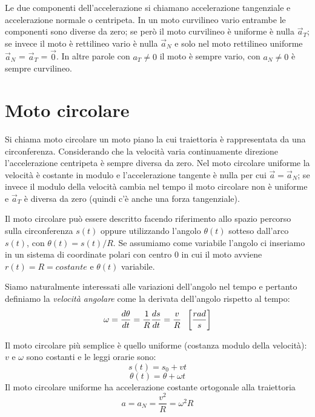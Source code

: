 \documentclass[class=book, crop=false, oneside, 12pt]{standalone}
\begin{document}
Le due componenti dell'accelerazione si chiamano accelerazione tangenziale e accelerazione normale o centripeta.
In un moto curvilineo vario entrambe le componenti sono diverse da zero; se però il moto curvilineo è uniforme è nulla \(\overrightarrow{a}_T\); se invece il moto è rettilineo vario è nulla \(\overrightarrow{a}_N\) e solo nel moto rettilineo uniforme \(\overrightarrow{a}_N\) = \(\overrightarrow{a}_T\) = \(\overrightarrow{0}\).
In altre parole con \(a_T \neq 0\) il moto è sempre vario, con \(a_N \neq 0\) è  sempre curvilineo.

\section{Moto circolare}

Si chiama moto circolare un moto piano la cui traiettoria è rappresentata da una circonferenza. Considerando che la velocità varia continuamente direzione l'accelerazione centripeta è sempre diversa da zero.
Nel moto circolare uniforme la velocità è costante in modulo e l'accelerazione tangente è nulla per cui \(\overrightarrow{a} = \overrightarrow{a}_N\);
se invece il modulo della velocità cambia nel tempo il moto circolare non è uniforme e \(\overrightarrow{a}_T\) è diversa da zero (quindi c'è anche una forza tangenziale).

Il moto circolare può essere descritto facendo riferimento allo spazio percorso sulla circonferenza \(s(t)\) oppure
utilizzando l'angolo \(\theta (t)\) sotteso dall'arco \(s(t)\), con \(\theta(t) = s(t)/R\).
Se assumiamo come variabile l'angolo ci inseriamo in un sistema di coordinate polari con centro \(0\) in cui il moto avviene \(r(t) = R = costante\) e \(\theta(t)\) variabile.

Siamo naturalmente interessati alle variazioni dell'angolo nel tempo e pertanto definiamo la \emph{velocità angolare} come la derivata dell'angolo rispetto al tempo:
\begin{equation}
  \omega = \frac{d \theta}{dt} = \frac{1}{R} \frac {ds} {dt} = \frac{v}{R} \hspace{0.2cm} \left[\frac{rad}{s}\right]
\end{equation}

Il moto circolare più semplice è quello uniforme (costanza modulo della velocità): \(v\) e \(\omega\) sono costanti e le leggi orarie sono:
\begin{equation}
  s(t) = s_0 + vt
\end{equation}
\begin{equation}
  \theta(t) = \theta + \omega t
\end{equation}
Il moto circolare uniforme ha accelerazione costante ortogonale alla traiettoria
\begin{equation}
  a = a_N = \frac{v^2}{R} = \omega^2 R
\end{equation}
\end{document}
